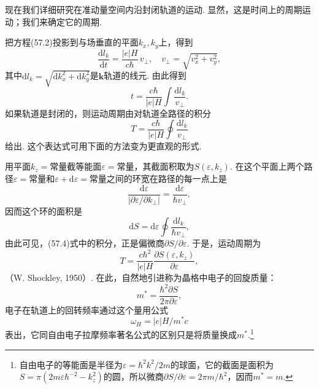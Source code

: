 现在我们详细研究在准动量空间内沿封闭轨道的运动. 显然，这是时间上的周期运动；我们来确定它的周期.

把方程(57.2)投影到与场垂直的平面$k_x,k_y$上，得到
\begin{equation*}
\frac{\mathrm dl_k}{\mathrm dt}=\frac{|e|H}{c\hbar}\,v_{\perp},\quad
v_{\perp}=\sqrt{v_x^2+v_y^2},
\end{equation*}
其中$\mathrm dl_k=\sqrt{\mathrm dk_x^2+\mathrm dk_y^2}$是$\bm k$轨道的线元. 由此得到
\begin{equation*}
t=\frac{c\hbar}{|e|H}\int\frac{\mathrm dl_k}{v_{\perp}}.
\end{equation*}
如果轨道是封闭的，则运动周期由对轨道全路径的积分
\begin{equation}
T=\frac{c\hbar}{|e|H}\oint\frac{\mathrm dl_k}{v_{\perp}}
\label{57.4}
\end{equation}
给出. 这个表达式可用下面的方法变为更直观的形式.

用平面$k_z=$常量截等能面$\varepsilon=$常量，其截面积取为$S(\varepsilon,k_z)$. 在这个平面上两个路径$\varepsilon=$常量和$\varepsilon+\mathrm d\varepsilon=$常量之间的环宽在路径的每一点上是
\begin{equation*}
\frac{\mathrm d\varepsilon}{|\partial\varepsilon/\partial k_{\perp}|}=\frac{\mathrm d\varepsilon}{\hbar v_{\perp}},
\end{equation*}
因而这个环的面积是
\begin{equation*}
\mathrm dS=\mathrm d\varepsilon\oint\frac{\mathrm dl_k}{\hbar v_{\perp}},
\end{equation*}
由此可见，(57.4)式中的积分，正是偏微商$\partial S/\partial\varepsilon$. 于是，运动周期为
\begin{equation}
T=\frac{c\hbar^2}{|e|H}\frac{\partial S(\varepsilon,k_z)}{\partial\varepsilon},
\label{57.5}
\end{equation}
（W. Shockley, 1950）. 在此，自然地引进称为晶格中电子的回旋质量：
\begin{equation}
m^{*}=\frac{\hbar^2\partial S}{2\pi\partial\varepsilon},
\label{57.6}
\end{equation}
电子在轨道上的回转频率通过这个量用公式
\begin{equation}
\omega_H=|e|H/m^{*}c
\label{57.7}
\end{equation}
表出，它同自由电子拉摩频率著名公式的区别只是将质量换成$m^{*}$.\footnote{自由电子的等能面是半径为$\varepsilon=\hbar^2k^2/2m$的球面，它的截面是面积为$S=\pi(2m\varepsilon\hbar^{-2}-k_z^2)$的圆，所以微商$\partial S/\partial\varepsilon=2\pi m/\hbar^2$，因而$m^{*}=m$.}

